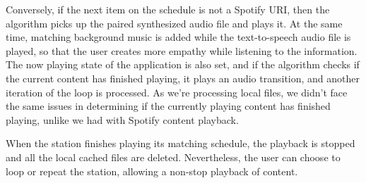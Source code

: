 Conversely, if the next item on the schedule is not a Spotify \ac{URI}, then the algorithm picks up the paired synthesized audio file and plays it. At the same time, matching background music is added while the text-to-speech audio file is played, so that the user creates more empathy while listening to the information. The now playing state of the application is also set, and if the algorithm checks if the current content has finished playing, it plays an audio transition, and another iteration of the loop is processed. As we're processing local files, we didn't face the same issues in determining if the currently playing content has finished playing, unlike we had with Spotify content playback.

When the station finishes playing its matching schedule, the playback is stopped and all the local cached files are deleted. Nevertheless, the user can choose to loop or repeat the station, allowing a non-stop playback of content.

